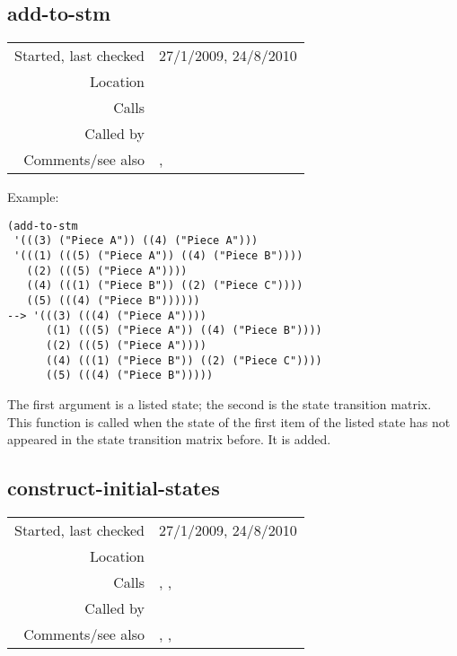 \subsection*{add-to-stm}\label{fun:add-to-stm}

\vspace{0.3cm}
\begin{tabular}{r|p{8cm}}
Started, last checked & 27/1/2009, 24/8/2010 \\
Location & \nameref{sec:markov-analyse} \\
Calls & \\
Called by & \nameref{fun:present-to-stm} \\
Comments/see also & \nameref{fun:accumulate-to-stm}, \nameref{fun:add-to-stm<-}
\end{tabular}

\vspace{0.5cm}
\noindent Example:
\begin{verbatim}
(add-to-stm
 '(((3) ("Piece A")) ((4) ("Piece A")))
 '(((1) (((5) ("Piece A")) ((4) ("Piece B"))))
   ((2) (((5) ("Piece A"))))
   ((4) (((1) ("Piece B")) ((2) ("Piece C"))))
   ((5) (((4) ("Piece B"))))))
--> '(((3) (((4) ("Piece A"))))
      ((1) (((5) ("Piece A")) ((4) ("Piece B"))))
      ((2) (((5) ("Piece A"))))
      ((4) (((1) ("Piece B")) ((2) ("Piece C"))))
      ((5) (((4) ("Piece B")))))
\end{verbatim}

\noindent The first argument is a listed state; the
second is the state transition matrix. This function
is called when the state of the first item of the
listed state has not appeared in the state transition
matrix before. It is added.


\subsection*{construct-initial-states}\label{fun:construct-initial-states}

\vspace{0.3cm}
\begin{tabular}{r|p{8cm}}
Started, last checked & 27/1/2009, 24/8/2010 \\
Location & \nameref{sec:markov-analyse} \\
Calls & \nameref{fun:beat-spacing-states}, \nameref{fun:firstn}, \nameref{fun:spacing-holding-states} \\
Called by & \\
Comments/see also & \nameref{fun:construct-final-states}, \nameref{fun:construct-stm}, \nameref{fun:construct-stm<-}
\end{tabular}

